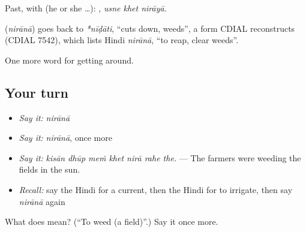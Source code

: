Past, with  (he or she …):   , \emph{usne khet nirāyā}.

\begin{cousinweb}
\textbf{} (\emph{nirānā}) goes back to \emph{*nīḍāti}, \textquotedblleft{}cuts down, weeds\textquotedblright{}, a form CDIAL reconstructs (CDIAL 7542), which lists Hindi \emph{nirānā}, \textquotedblleft{}to reap, clear weeds\textquotedblright{}.
\end{cousinweb}

\begin{grammarlens}[title={What you've built}]
One more word for getting around.
\end{grammarlens}

\subsection*{Your turn}
\begin{itemize}
\raggedright
  \item \emph{Say it:} \emph{nirānā}
  \item \emph{Say it:} \emph{nirānā}, once more
  \item \emph{Say it:} \emph{kisān dhūp meṁ khet nirā rahe the.} — The farmers were weeding the fields in the sun.
  \item \emph{Recall:} say the Hindi for a current, then the Hindi for to irrigate, then say \emph{nirānā} again
\end{itemize}

\begin{tcolorbox}[breakable,colback=teal!4,colframe=teal!35!black,title={Before you move on}]
What does  mean? (\textquotedblleft{}To weed (a field)\textquotedblright{}.) Say it once more.
\end{tcolorbox}
